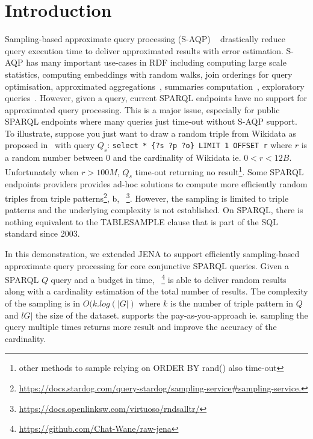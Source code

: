 
\section{Introduction}

Sampling-based approximate query processing (S-AQP)
~\cite{DBLP:conf/sigmod/AgarwalMKTJMMS14} drastically reduce query
execution time to deliver approximated results with error
estimation. S-AQP has many important use-cases in RDF including
computing large scale
statistics\cite{soulet2019anytime,10.1007/978-3-319-18818-8_14},
computing embeddings with random walks\cite{ristoski2016rdf2vec}, join
orderings for query optimisation\cite{DBLP:conf/cidr/LeisRGK017},
approximated
aggregations~\cite{DBLP:journals/tods/LiWYZ19,DBLP:conf/cikm/00010XYPZ2},
summaries computation~\cite{10.1007/978-3-030-49461-2_10}, exploratory
queries~\cite{DBLP:conf/sigmod/AgarwalMKTJMMS14}.  However, given a
query, current SPARQL endpoints have no support for approximated query
processing. This is a major issue, especially  for public SPARQL endpoints where
many queries just time-out without S-AQP support. To illustrate, suppose you just want to draw a
random triple from Wikidata as proposed in~\cite{soulet2019anytime} with query $Q_s$:
%
\verb+select * {?s ?p ?o} LIMIT 1 OFFSET r+
%
where $r$ is a random number between 0 and the cardinality of Wikidata
 ie. $0<r<12B$. Unfortunately when $r>100M$,
$Q_s$ time-out  returning no result\footnote{other methods
  to sample relying on ORDER BY rand() also time-out}. Some SPARQL endpoints
  providers provides ad-hoc solutions to compute more efficiently
  random triples from triple
  patterns\footnote{\url{https://docs.stardog.com/query-stardog/sampling-service\#sampling-service.}},
  b,
  ~\footnote{\url{https://docs.openlinksw.com/virtuoso/rndsalltr/}}. However,
   the sampling is
  limited to triple patterns and the underlying complexity is not
  established. On SPARQL, there is nothing equivalent to the
  TABLESAMPLE clause that is part of the SQL standard since 2003.


  In this demonstration, we extended JENA to support efficiently
  sampling-based approximate query processing for core conjunctive
  SPARQL queries.  Given a SPARQL $Q$ query and a budget in time,
  \NAME~\footnote{\url{https://github.com/Chat-Wane/raw-jena}} is able
  to deliver random results along with a cardinality estimation of the
  total number of results. The complexity of the sampling is in
  $O(k.log(|G|)$ where $k$ is the number of triple pattern in $Q$ and
  $lG|$ the size of the dataset. \NAME supports the
  pay-as-you-approach ie. sampling the query multiple times returns
  more result and improve the accuracy of the cardinality.

